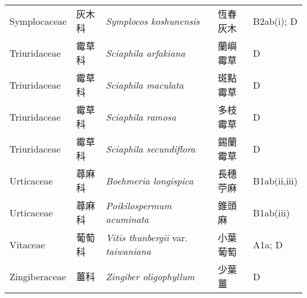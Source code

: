 {\begin{longtable}{p{2.5cm}p{2.5cm}p{4.5cm}p{2.5cm}p{3cm}}
    Symplocaceae & 灰木科 & \textit{Symplocos koshunensis}  & 恆春灰木 & B2ab(i); D \index{Symplocos@\textit{Symplocos}!koshunensis@\textit{koshunensis}}  \index{恆春灰木} \\
    Triuridaceae & 霉草科 & \textit{Sciaphila arfakiana}  & 蘭嶼霉草 & D \index{Sciaphila@\textit{Sciaphila}!arfakiana@\textit{arfakiana}}  \index{蘭嶼霉草} \\
    Triuridaceae & 霉草科 & \textit{Sciaphila maculata}  & 斑點霉草 & D \index{Sciaphila@\textit{Sciaphila}!maculata@\textit{maculata}}  \index{斑點霉草} \\
    Triuridaceae & 霉草科 & \textit{Sciaphila ramosa}  & 多枝霉草 & D \index{Sciaphila@\textit{Sciaphila}!ramosa@\textit{ramosa}}  \index{多枝霉草} \\
    Triuridaceae & 霉草科 & \textit{Sciaphila secundiflora}  & 錫蘭霉草 & D \index{Sciaphila@\textit{Sciaphila}!secundiflora@\textit{secundiflora}}  \index{錫蘭霉草} \\
    Urticaceae & 蕁麻科 & \textit{Boehmeria longispica}  & 長穗苧麻 & B1ab(ii,iii) \index{Boehmeria@\textit{Boehmeria}!longispica@\textit{longispica}}  \index{長穗苧麻} \\
    Urticaceae & 蕁麻科 & \textit{Poikilospermum acuminata}  & 錐頭麻 & B1ab(iii) \index{Poikilospermum@\textit{Poikilospermum}!acuminata@\textit{acuminata}}  \index{錐頭麻} \\
    Vitaceae & 葡萄科 & \textit{Vitis thunbergii} var. \textit{taiwaniana}  & 小葉葡萄 & A1a; D \index{Vitis@\textit{Vitis}!thunbergii@\textit{thunbergii}!var. taiwaniana@var. \textit{taiwaniana}}  \index{小葉葡萄} \\
    Zingiberaceae & 薑科 & \textit{Zingiber oligophyllum}  & 少葉薑 & D \index{Zingiber@\textit{Zingiber}!oligophyllum@\textit{oligophyllum}}  \index{少葉薑} \\
    \bottomrule
        \end{longtable}
        }
    